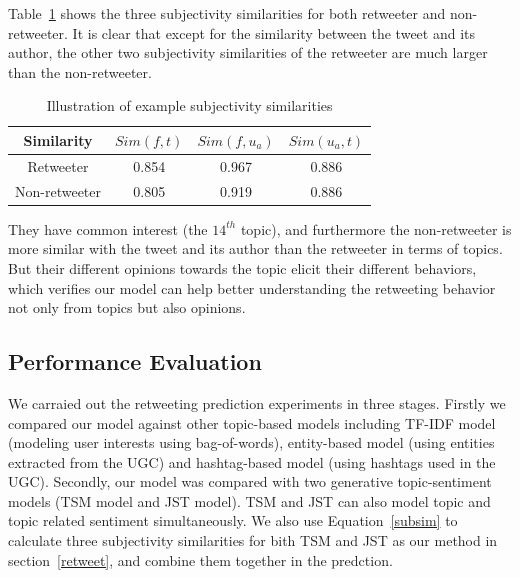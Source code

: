 \documentclass[letterpaper]{article}
\begin{document}
Table~\ref{tab4} shows the three subjectivity similarities for both retweeter and non-retweeter. It is clear that except for the similarity between the tweet and its author, the other two subjectivity similarities of the retweeter are much larger than the non-retweeter.
\begin{table}[h]
\scriptsize
\centering
\caption{ Illustration of example subjectivity similarities}
\label{tab4}
\begin{tabular}{|c|c|c|c|}
\hline
Similarity & $ Sim(f,t) $ & $ Sim(f,u_a)  $ & $ Sim(u_a,t)  $\\
\hline
Retweeter & 0.854 & 0.967 & 0.886\\
\hline
Non-retweeter & 0.805 & 0.919 & 0.886\\
\hline
\end{tabular}
\end{table} 
They have common interest (the $ 14^{th} $ topic), and furthermore the non-retweeter is more similar with the tweet and its author than the retweeter in terms of topics. But their different opinions towards the topic elicit their different behaviors, which verifies our model can help better understanding the retweeting behavior not only from topics but also opinions.

\subsection{Performance Evaluation}

We carraied out the retweeting prediction experiments in three stages. Firstly we compared our model against other topic-based models including TF-IDF model (modeling user interests using bag-of-words), entity-based model (using entities extracted from the UGC) and hashtag-based model (using hashtags used in the UGC)\cite{abel2011analyzing}.
Secondly, our model was compared with two generative topic-sentiment models (TSM model\cite{mei2007topic} and JST model\cite{lin2009joint}). TSM and JST can also model topic and topic related sentiment simultaneously. We also use Equation~\ref{subsim} to calculate three  subjectivity similarities for bith TSM and JST as our method in section~\ref{retweet}, and combine them together in the predction.
\end{document}
